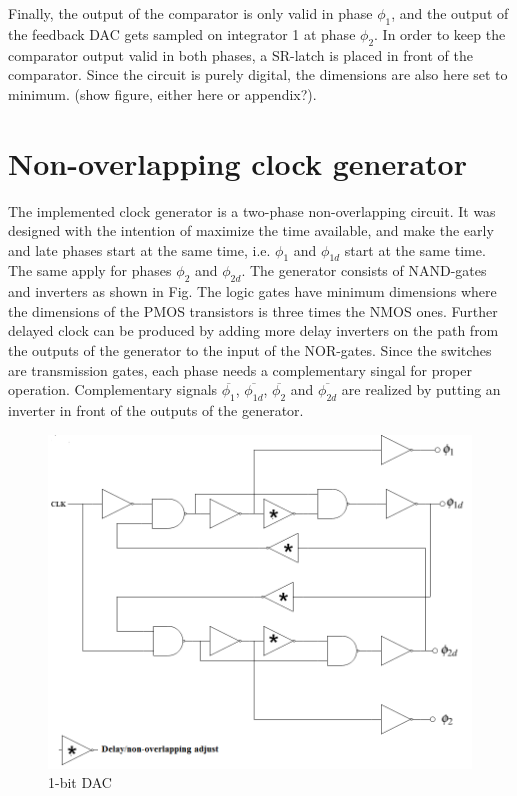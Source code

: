 Finally, the output of the comparator is only valid in phase $\phi_1$, and the output of the feedback DAC gets sampled on integrator 1 at phase $\phi_2$. In order to keep the comparator output valid in both phases, a SR-latch is placed in front of the comparator. Since the circuit is purely digital, the dimensions are also here set to minimum. (show figure, either here or appendix?).

\section{Non-overlapping clock generator}
The implemented clock generator is a two-phase non-overlapping circuit. It was designed with the intention of maximize the time available, and make the early and late phases start at the same time, i.e. $\phi_1$ and $\phi_{1d}$ start at the same time. The same apply for phases $\phi_2$ and $\phi_{2d}$. The generator consists of NAND-gates and inverters as shown in Fig. The logic gates have minimum dimensions where the dimensions of the PMOS transistors is three times the NMOS ones. Further delayed clock can be produced by adding more delay inverters on the path from the outputs of the generator to the input of the NOR-gates. Since the switches are transmission gates, each phase needs a complementary singal for proper operation. Complementary signals $\overline{\phi_1}$, $\overline{\phi_{1d}}$, $\overline{\phi_2}$ and $\overline{\phi_{2d}}$ are realized by putting an inverter in front of the outputs of the generator. 

\begin{figure}[h]
\centering
\includegraphics[scale = 0.5]{images/two_phase_clock.png}
\caption{1-bit DAC}
\label{clock_block}
\end{figure}


